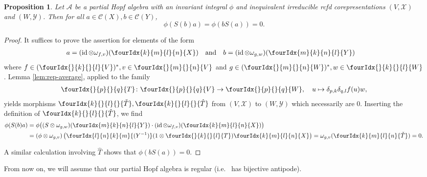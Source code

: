\documentclass[10pt]{article}
\DeclareMathOperator{\id}{id}
\newcommand{\dual}[1]{#1^{*}}
\newcommand{\Gr}[5]{\fourIdx{#2}{#4}{#3}{#5}{#1}}%
\newcommand{\Gru}[3]{\Gr{#1}{}{}{#2}{#3}}
\newcommand{\Grd}[3]{\Gr{#1}{#2}{#3}{}{}}
\newtheorem{Prop}[Theorem]{Proposition}
\theoremstyle{definition}
\numberwithin{equation}{section}
\begin{document}
\begin{Prop} \label{prop:rep-orthogonality-1} Let $\mathcal{A}$ be a
  partial Hopf algebra with an invariant integral $\phi$ and inequivalent
  irreducible rcfd corepresentations $(V,\mathscr{X})$ and
  $(W,\mathscr{Y})$.  Then  for all
  $a\in \mathcal{C}(X), b \in \mathcal{C}(Y)$,
  \[\phi(S(b)a) = \phi(bS(a))=0.\]
\end{Prop}
\begin{proof}
It suffices to prove the assertion for  elements of the form
\begin{align*}
  a&=(\id \otimes \omega_{f,v})(\Gr{X}{k}{l}{m}{n})  && \text{and} &
  b&=(\id \otimes \omega_{g,w})(\Gr{Y}{m}{n}{k}{l})
\end{align*}
where $f\in \dual{(\Gru{V}{k}{l})}, v \in \Gru{V}{m}{n}$ and $g \in
\dual{(\Gru{W}{m}{n})}, w \in \Gru{W}{k}{l}$.  Lemma
\ref{lem:rep-average}, applied to the family
  \begin{align*}
    \Gru{T}{p}{q} \colon \Gru{V}{p}{q} \to \Gru{W}{p}{q}, \quad u
    \mapsto  \delta_{p,k}\delta_{q,l}  f(u)w,
  \end{align*}
  yields morphisms $\Grd{\check{T}}{k}{l},\Grd{\hat{T}}{k}{l}$ from $(V,\mathscr{X})$ to
  $(W,\mathscr{Y})$ which necessarily are $0$. Inserting the
  definition of $\Grd{\check{T}}{k}{l}$, we find
  \begin{align*}
    \phi(S(b)a) &= \phi\big((S \otimes
    \omega_{g,w})(\Gr{Y}{m}{n}{k}{l}) \cdot (\id \otimes
    \omega_{f,v})(\Gr{X}{k}{l}{m}{n})\big) \\ &= (\phi \otimes \omega_{g,v})\left(\Gr{(Y^{-1})}{l}{k}{n}{m}(1 \otimes
      \Gru{T}{k}{l} )     \Gr{X}{k}{l}{m}{n}\right) 
    = \omega_{g,v}( \Gr{\check{T}}{k}{l}{m}{n}) = 0.
  \end{align*}
  
  A similar calculation involving $\hat{T}$ shows that
  $\phi(bS(a))=0$.  
\end{proof}

From now on, we will assume that our partial Hopf algebra is regular (i.e.~ has bijective antipode).
\end{document}
